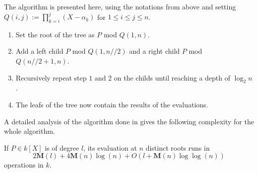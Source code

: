 \documentclass[../main.tex]{subfilesubs}
\begin{document}
The algorithm is presented here, using the notations from above and setting $Q(i, j) :=\prod_{k=i}^j (X-\alpha_k)$ for $1\leq i\leq j\leq n$.
\begin{enumerate}
	\item Set the root of the tree as $P$ mod $Q(1, n)$.
	\item Add a left child $P$ mod $Q(1, n//2)$ and a right child $P$ mod $Q(n//2 + 1, n)$.
	\item Recursively repeat step $1$ and $2$ on the childs until reaching a depth of $\log_2n$.
	\item The leafs of the tree now contain the results of the evaluations.
\end{enumerate}
A detailed analysis of the algorithm done in \cite{} gives the following complexity for the whole algorithm.
\begin{lemma}
	If $P\in k[X]$ is of degree $l$, its evaluation at $n$ distinct roots runs in
	\[
		2\mathbf{M}(l) + 4\mathbf{M}(n)\log(n) + O(l + \mathbf{M}(n)\log\log(n))
	\]
operations in $k$.
\end{lemma}
\end{document}
